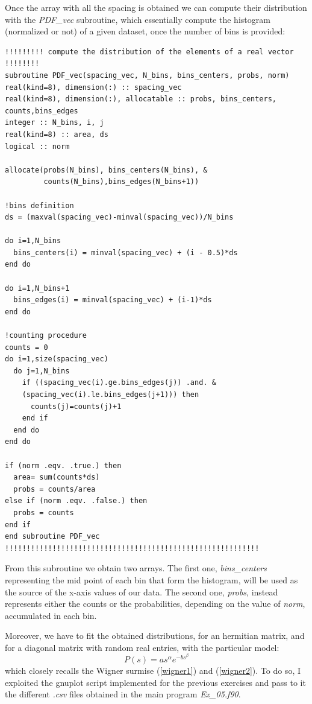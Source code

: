 \documentclass[prb,9pt,notitlepage]{revtex4-1}
\begin{document}
Once the array with all the spacing is obtained we can compute their distribution with the \textit{PDF\_vec} subroutine, which essentially compute the histogram (normalized or not) of a given dataset, once the number of bins is provided:
\begin{lstlisting}
!!!!!!!!! compute the distribution of the elements of a real vector !!!!!!!!
subroutine PDF_vec(spacing_vec, N_bins, bins_centers, probs, norm)
real(kind=8), dimension(:) :: spacing_vec
real(kind=8), dimension(:), allocatable :: probs, bins_centers, counts,bins_edges
integer :: N_bins, i, j
real(kind=8) :: area, ds
logical :: norm

allocate(probs(N_bins), bins_centers(N_bins), &
         counts(N_bins),bins_edges(N_bins+1))

!bins definition
ds = (maxval(spacing_vec)-minval(spacing_vec))/N_bins

do i=1,N_bins
  bins_centers(i) = minval(spacing_vec) + (i - 0.5)*ds
end do

do i=1,N_bins+1
  bins_edges(i) = minval(spacing_vec) + (i-1)*ds
end do

!counting procedure
counts = 0
do i=1,size(spacing_vec)
  do j=1,N_bins
    if ((spacing_vec(i).ge.bins_edges(j)) .and. &
    (spacing_vec(i).le.bins_edges(j+1))) then
      counts(j)=counts(j)+1
    end if
  end do
end do

if (norm .eqv. .true.) then
  area= sum(counts*ds)
  probs = counts/area
else if (norm .eqv. .false.) then
  probs = counts
end if
end subroutine PDF_vec
!!!!!!!!!!!!!!!!!!!!!!!!!!!!!!!!!!!!!!!!!!!!!!!!!!!!!!!!!!!
\end{lstlisting}
From this subroutine we obtain two arrays. The first one, \textit{bins\_centers} representing the mid point of each bin that form the histogram, will be used as the source of the x-axis values of our data. The second one, \textit{probs}, instead represents either the counts or the probabilities, depending on the value of \textit{norm}, accumulated in each bin.

Moreover, we have to fit the obtained distributions, for an hermitian matrix, and for a diagonal matrix with random real entries, with the particular model:
\begin{equation}
  P(s) = as^{\alpha}e^{-bs^{\beta}}
\end{equation}
which closely recalls the Wigner surmise (\ref{wigner1}) and (\ref{wigner2}). To do so, I exploited the gnuplot script implemented for the previous exercises and pass to it the different \textit{.csv} files obtained in the main program \textit{Ex\_05.f90}.
\end{document}
